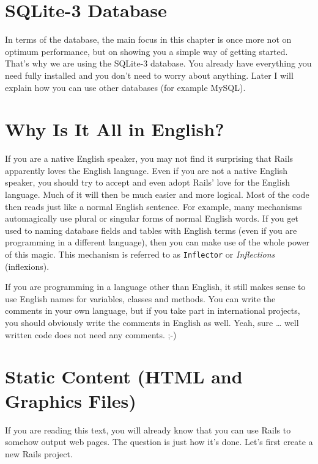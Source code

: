 \documentclass[a4paper]{book}
\newcounter{tab}[chapter]
\begin{document}
\section{SQLite-3 Database}\label{sqlite-3-database}

In terms of the database, the main focus in this chapter is once more not on optimum performance, but on showing you a simple way of getting started. That's why we are using the SQLite-3 database. You already have everything you need fully installed and you don't need to worry about anything. Later I will explain how you can use other databases (for example MySQL).

\section{Why Is It All in English?}\label{why-is-it-all-in-english}

If you are a native English speaker, you may not find it surprising that Rails apparently loves the English language. Even if you are not a native English speaker, you should try to accept and even adopt Rails' love for the English language. Much of it will then be much easier and more logical. Most of the code then reads just like a normal English sentence. For example, many mechanisms automagically use plural or singular forms of normal English words. If you get used to naming database fields and tables with English terms (even if you are programming in a different language), then you can make use of the whole power of this magic. This mechanism is referred to as \texttt{Inflector} or \emph{Inflections} (inflexions).

If you are programming in a language other than English, it still makes sense to use English names for variables, classes and methods. You can write the comments in your own language, but if you take part in international projects, you should obviously write the comments in English as well. Yeah, sure \ldots{} well written code does not need any comments. ;-)

\section{Static Content (HTML and Graphics Files)}\label{static-content-html-and-graphics-files}

If you are reading this text, you will already know that you can use Rails to somehow output web pages. The question is just how it's done. Let's first create a new Rails project.
\end{document}
